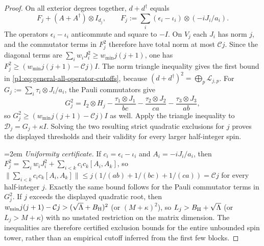 \documentclass[11pt]{article}
\begin{document}
\begin{proof}
On all exterior degrees together, $d+d^\dagger$ equals
\[
  F_j+(A+A^\dagger)\otimes I_{d_j},\qquad
  F_j:=\sum_i(\epsilon_i-\iota_i)\otimes(-iJ_i/a_i).
\]
The operators $\epsilon_i-\iota_i$ anticommute and square to $-I$.
On $V_j$ each $J_i$ has norm $j$, and the commutator terms in $F_j^2$
therefore have total norm at most $\mathcal Cj$.  Since the diagonal
terms are $\sum_iw_iJ_i^2\ge w_{\min}j(j+1)$, one has
$F_j^2\ge(w_{\min}j(j+1)-\mathcal Cj)I$.
The norm triangle inequality gives the first bound in
\eqref{p1:eq:general-all-operator-cutoffs}, because
$(d+d^\dagger)^2=\bigoplus_p\mathscr L_{j,p}$.
For $G_j:=\sum_i\tau_i\otimes J_i/a_i$, the Pauli commutators give
\[
 G_j^2=I_2\otimes H_j
    -\frac{\tau_1\otimes J_1}{bc}
    -\frac{\tau_2\otimes J_2}{ca}
    -\frac{\tau_3\otimes J_3}{ab},
\]
so $G_j^2\ge(w_{\min}j(j+1)-\mathcal Cj)I$ as well.
Apply the triangle inequality to $\mathscr D_j=G_j+\kappa I$.
Solving the two resulting strict quadratic exclusions for $j$ proves
the displayed thresholds and their validity for every larger
half-integer spin.

{\emergencystretch=2em
\emph{Uniformity certificate.}  If $c_i=\epsilon_i-\iota_i$ and
$A_i=-iJ_i/a_i$, then
$F_j^2=\sum_iw_iJ_i^2+
\sum_{i<k}c_ic_k[A_i,A_k]$, so
$\|\sum_{i<k}c_ic_k[A_i,A_k]\|\le
j(1/(ab)+1/(bc)+1/(ca))=\mathcal Cj$ for every half-integer $j$.
Exactly the same bound follows for the Pauli commutator terms in
$G_j^2$.  If $j$ exceeds the displayed quadratic root, then
$w_{\min}j(j+1)-\mathcal Cj>(\sqrt\Lambda+B_{\rm H})^2$
(or $(M+\kappa)^2$), so $L_j>B_{\rm H}+\sqrt\Lambda$
(or $L_j>M+\kappa$) with no unstated restriction on the
matrix dimension.  The inequalities are therefore certified exclusion
bounds for the entire unbounded spin tower, rather than an empirical
cutoff inferred from the first few blocks.\par}

\end{proof}
\end{document}
